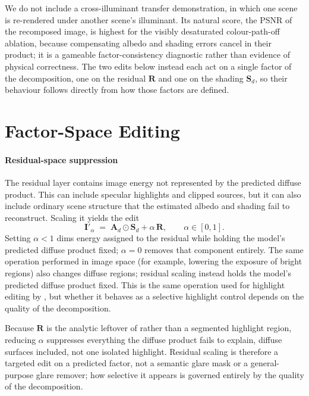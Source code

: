 We do not include a cross-illuminant transfer demonstration, in which one scene is
re-rendered under another scene's illuminant. Its natural score, the PSNR of the
recomposed image, is highest for the visibly desaturated colour-path-off ablation,
because compensating albedo and shading errors cancel in their product; it is a
gameable factor-consistency diagnostic rather than evidence of physical correctness.
The two edits below instead each act on a single factor of the decomposition, one on the
residual $\mathbf{R}$ and one on the shading $\mathbf{S}_d$, so their behaviour follows
directly from how those factors are defined.


\section{Factor-Space Editing}
\label{sec:factor_edit}

\paragraph{Residual-space suppression}

The residual layer contains image energy not represented by the predicted diffuse
product. This can include specular highlights and clipped sources, but it can also
include ordinary scene structure that the estimated albedo and shading fail to
reconstruct.
Scaling it yields the edit
\begin{equation}
  \mathbf{I}'_{\alpha}
  \;=\;
  \mathbf{A}_d \odot \mathbf{S}_d + \alpha\,\mathbf{R},
  \qquad \alpha \in [0, 1] .
  \label{eq:glare}
\end{equation}
Setting $\alpha < 1$ dims energy assigned to the residual while holding the
model's predicted diffuse product fixed; $\alpha = 0$ removes that component
entirely.
The same operation performed in image space (for example, lowering the exposure
of bright regions) also changes diffuse regions; residual scaling instead holds
the model's predicted diffuse product fixed.
This is the same operation used for highlight editing by
, but whether it behaves as a selective highlight
control depends on the quality of the decomposition.

Because $\mathbf{R}$ is the analytic leftover of  rather than a
segmented highlight region, reducing $\alpha$ suppresses everything the diffuse product
fails to explain, diffuse surfaces included, not one isolated highlight. Residual scaling
is therefore a targeted edit on a predicted factor, not a semantic glare mask or a
general-purpose glare remover; how selective it appears is governed entirely by the
quality of the decomposition.

